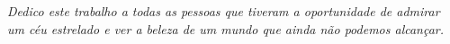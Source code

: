 \cleardoublepage
\begin{dedicatoria}
   \vspace*{\fill}
   \centering
   \noindent
   \textit{Dedico este trabalho a todas as pessoas que tiveram a oportunidade de admirar um céu estrelado e ver a beleza de um mundo que ainda não podemos alcançar. } 
   \vspace*{\fill}
\end{dedicatoria}
